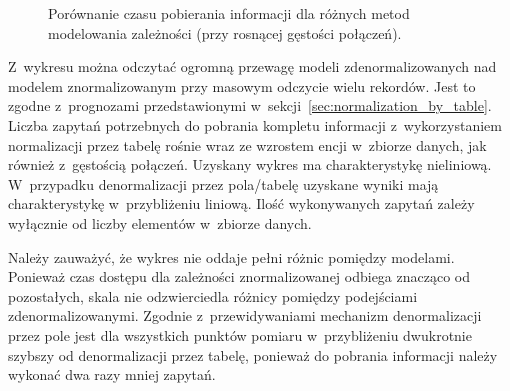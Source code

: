 \begin{figure}[ht!]
	\centering

	\caption{Porównanie czasu pobierania informacji dla różnych metod modelowania zależności (przy rosnącej gęstości połączeń).}
	\label{fig:select_time_relation_density_comparison}
\end{figure}

Z~wykresu można odczytać ogromną przewagę modeli zdenormalizowanych nad modelem znormalizowanym przy masowym odczycie wielu rekordów. Jest to zgodne z~prognozami przedstawionymi w~sekcji~\ref{sec:normalization_by_table}. Liczba zapytań potrzebnych do pobrania kompletu informacji z~wykorzystaniem normalizacji przez tabelę rośnie wraz ze wzrostem encji w~zbiorze danych, jak również z~gęstością połączeń. Uzyskany wykres ma charakterystykę nieliniową. W~przypadku denormalizacji przez pola/tabelę uzyskane wyniki mają charakterystykę w~przybliżeniu liniową. Ilość wykonywanych zapytań zależy wyłącznie od liczby elementów w~zbiorze danych.

Należy zauważyć, że wykres nie oddaje pełni różnic pomiędzy modelami. Ponieważ czas dostępu dla zależności znormalizowanej odbiega znacząco od pozostałych, skala nie odzwierciedla różnicy pomiędzy podejściami zdenormalizowanymi. Zgodnie z~przewidywaniami mechanizm denormalizacji przez pole jest dla wszystkich punktów pomiaru w~przybliżeniu dwukrotnie szybszy od denormalizacji przez tabelę, ponieważ do pobrania informacji należy wykonać dwa razy mniej zapytań.

